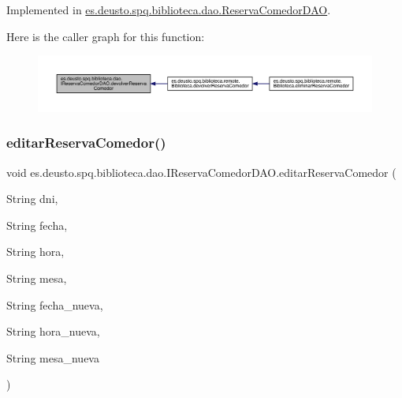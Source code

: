 Implemented in \mbox{\hyperlink{classes_1_1deusto_1_1spq_1_1biblioteca_1_1dao_1_1_reserva_comedor_d_a_o_aa8bb09a0de105a3b0d595fccd6f37d5b}{es.\+deusto.\+spq.\+biblioteca.\+dao.\+Reserva\+Comedor\+D\+AO}}.

Here is the caller graph for this function\+:
\nopagebreak
\begin{figure}[H]
\begin{center}
\leavevmode
\includegraphics[width=350pt]{interfacees_1_1deusto_1_1spq_1_1biblioteca_1_1dao_1_1_i_reserva_comedor_d_a_o_a8e5a8ca90742ac0fc9231341e3a4fc5e_icgraph}
\end{center}
\end{figure}
\mbox{\label{interfacees_1_1deusto_1_1spq_1_1biblioteca_1_1dao_1_1_i_reserva_comedor_d_a_o_af50553820cb529bd993f64c6496f6e2c}} 
\subsubsection{\texorpdfstring{editar\+Reserva\+Comedor()}{editarReservaComedor()}}
{\footnotesize\ttfamily void es.\+deusto.\+spq.\+biblioteca.\+dao.\+I\+Reserva\+Comedor\+D\+A\+O.\+editar\+Reserva\+Comedor (\begin{DoxyParamCaption}\item[{String}]{dni,  }\item[{String}]{fecha,  }\item[{String}]{hora,  }\item[{String}]{mesa,  }\item[{String}]{fecha\+\_\+nueva,  }\item[{String}]{hora\+\_\+nueva,  }\item[{String}]{mesa\+\_\+nueva }\end{DoxyParamCaption})}



